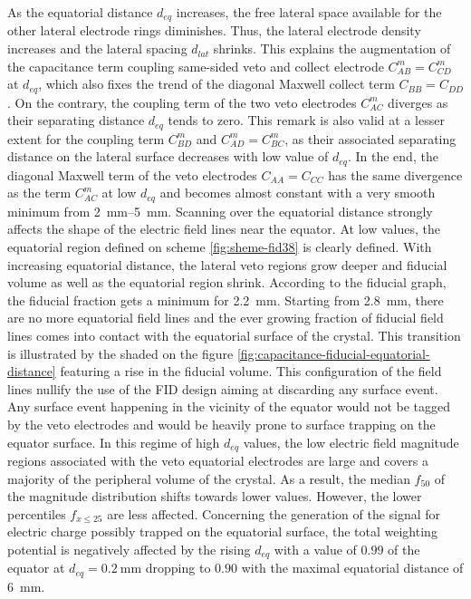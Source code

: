 As the equatorial distance $d_{eq}$ increases, the free lateral space available for the other lateral electrode rings diminishes. Thus, the lateral electrode density increases and the lateral spacing $d_{lat}$ shrinks. 
This explains the augmentation of the capacitance term coupling same-sided veto and collect electrode $C_{AB}^m=C_{CD}^m$ at $d_{eq}$, which also fixes the trend of the diagonal Maxwell collect term $C_{BB}=C_{DD}$. On the contrary, the coupling term of the two veto electrodes $C_{AC}^m$ diverges as their separating distance $d_{eq}$ tends to zero. This remark is also valid at a lesser extent for the coupling term $C_{BD}^m$ and $C_{AD}^m = C_{BC}^m$,  as their associated separating distance on the lateral surface decreases with low value of $d_{eq}$. In the end, the diagonal Maxwell term of the veto electrodes $C_{AA} = C_{CC}$ has the same divergence as the term $C_{AC}^m$ at low $d_{eq}$ and becomes almost constant with a very smooth minimum from \SIrange{2}{5}{\mm}.
Scanning over the equatorial distance strongly affects the shape of the electric field lines near the equator. At low values, the equatorial region defined on scheme \ref{fig:sheme-fid38} is clearly defined. With increasing equatorial distance, the lateral veto regions grow deeper and fiducial volume as well as the equatorial region shrink. According to the fiducial graph, the fiducial fraction gets a minimum for \SI{2.2}{\mm}. Starting from \SI{2.8}{\mm}, there are no more equatorial field lines and the ever growing fraction of fiducial field lines comes into contact with the equatorial surface of the crystal. This transition is illustrated by the shaded on the figure \ref{fig:capacitance-fiducial-equatorial-distance} featuring a rise in the fiducial volume. This configuration of the field lines nullify the use of the FID design aiming at discarding any surface event. Any surface event happening in the vicinity of the equator would not be tagged by the veto electrodes and would be heavily prone to surface trapping on the equator surface.
In this regime of high $d_{eq}$ values, the low electric field magnitude regions associated with the veto equatorial electrodes are large and covers a majority of the peripheral volume of the crystal. As a result, the median $f_{50}$ of the magnitude distribution shifts towards lower values. However, the lower percentiles $f_{x \leq 25}$ are less affected.
Concerning the generation of the signal for electric charge possibly trapped on the equatorial surface, the total weighting potential is negatively affected by the rising $d_{eq}$ with a value of $0.99$ of the equator at $d_{eq}=\SI{0.2}{\mm}$ dropping to $0.90$ with the maximal equatorial distance of \SI{6}{\mm}.

